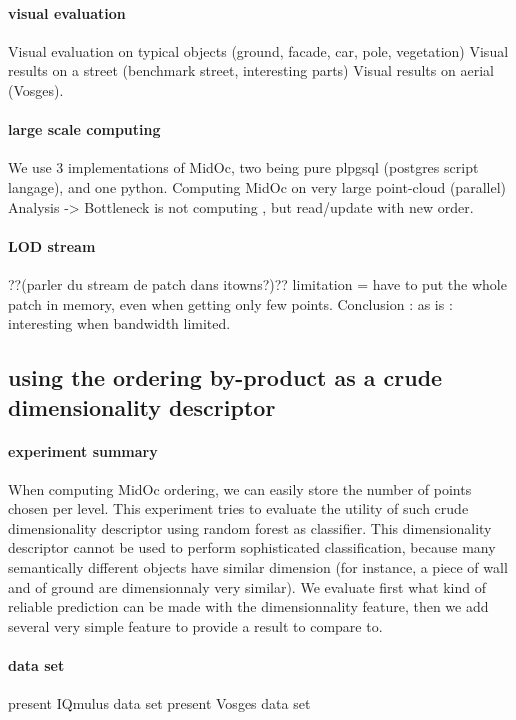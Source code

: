 		\paragraph{visual evaluation}
			Visual evaluation on typical objects (ground, facade, car, pole, vegetation)
			Visual results on a street (benchmark street, interesting parts)
			Visual results on aerial (Vosges).
		\paragraph{large scale computing}
			We use 3 implementations of MidOc, two being pure plpgsql (postgres script langage), and one python.
			Computing MidOc on very large point-cloud (parallel)
			Analysis -> Bottleneck is not computing , but read/update with new order. 
		\paragraph{LOD stream}
			??(parler du stream de patch dans itowns?)??
			limitation = have to put the whole patch in memory, even when getting only few points.
			Conclusion : as is : interesting when bandwidth limited.  
	\subsection{using the ordering by-product as a crude dimensionality descriptor}
		\paragraph{experiment summary}
			When computing MidOc ordering, we can easily store the number of points chosen per level.
			This experiment tries to evaluate the utility of such crude dimensionality descriptor using random forest as classifier.
			This dimensionality descriptor cannot be used to perform sophisticated classification, because many semantically different objects have similar dimension (for instance, a piece of wall and of ground are dimensionnaly very similar).
			We evaluate first what kind of reliable prediction can be made with the dimensionnality feature,
			then we add several very simple feature to provide a result to compare to.
			
			
		\paragraph{data set}
			present IQmulus data set
			present Vosges data set
		\paragraph{}
		
 